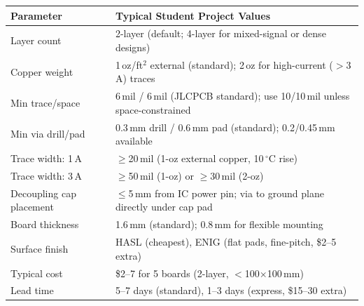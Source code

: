 \documentclass[11pt,letterpaper,twoside,openany]{book}
\newcommand{\degC}{\ensuremath{{}^{\circ}\text{C}}}
\begin{document}
\begin{quickrefbox}
\begin{table}[H]\centering\small
\begin{tabularx}{\textwidth}{l X}
\toprule
\textbf{Parameter} & \textbf{Typical Student Project Values} \\
\midrule
Layer count & 2-layer (default; 4-layer for mixed-signal or dense designs) \\
Copper weight & 1\,oz/ft$^2$ external (standard); 2\,oz for high-current ($>$3\,A) traces \\
Min trace/space & 6\,mil / 6\,mil (JLCPCB standard); use 10/10\,mil unless space-constrained \\
Min via drill/pad & 0.3\,mm drill / 0.6\,mm pad (standard); 0.2/0.45\,mm available \\
Trace width: 1\,A & $\geq$20\,mil (1-oz external copper, 10\,\degC{} rise) \\
Trace width: 3\,A & $\geq$50\,mil (1-oz) or $\geq$30\,mil (2-oz) \\
Decoupling cap placement & $\leq$5\,mm from IC power pin; via to ground plane directly under cap pad \\
Board thickness & 1.6\,mm (standard); 0.8\,mm for flexible mounting \\
Surface finish & HASL (cheapest), ENIG (flat pads, fine-pitch, \$2--5 extra) \\
Typical cost & \$2--7 for 5 boards (2-layer, $<$100$\times$100\,mm) \\
Lead time & 5--7 days (standard), 1--3 days (express, \$15--30 extra) \\
\bottomrule
\end{tabularx}
\end{table}
\end{quickrefbox}
\end{document}

